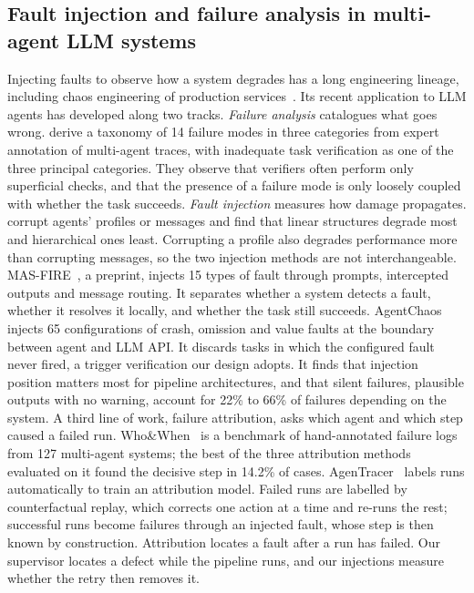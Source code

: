 \subsection{Fault injection and failure analysis in multi-agent LLM systems}
\label{sec:related-fi}

Injecting faults to observe how a system degrades has a long engineering
lineage, including chaos engineering of production services~\citep{basiri2016chaos}.
Its recent application to LLM agents has developed along two tracks.
\emph{Failure analysis} catalogues what goes wrong. \citet{cemri2025mast}
derive a taxonomy of 14 failure modes in three categories from expert annotation
of multi-agent traces, with inadequate task verification as one of the three
principal categories. They observe that verifiers often perform only
superficial checks, and that the presence of a failure mode is only loosely
coupled with whether the task succeeds. \emph{Fault injection} measures how
damage propagates. \citet{huang2025resilience} corrupt agents' profiles or
messages and find that linear structures degrade most and hierarchical ones
least. Corrupting a profile also degrades performance more than corrupting
messages, so the two injection methods are not interchangeable.
MAS-FIRE~\citep{jia2026masfire}, a preprint, injects 15 types of fault through
prompts, intercepted outputs and message routing. It separates whether a system
detects a fault, whether it resolves it locally, and whether the task still
succeeds. AgentChaos~\citep{tan2026agentchaos} injects 65 configurations of
crash, omission and value faults at the boundary between agent and LLM API.
It discards tasks in which the configured fault never fired, a trigger
verification our design adopts. It finds that injection position matters most
for pipeline architectures, and that silent failures, plausible outputs with no
warning, account for 22\% to 66\% of failures depending on the system.
A third line of work, failure attribution, asks which agent and which step
caused a failed run. Who\&When~\citep{zhang2025whowhen} is a benchmark of
hand-annotated failure logs from 127 multi-agent systems; the best of the three
attribution methods evaluated on it found the decisive step in 14.2\% of cases.
AgenTracer~\citep{zhang2026agentracer} labels runs automatically to train an
attribution model. Failed runs are labelled by counterfactual replay, which
corrects one action at a time and re-runs the rest; successful runs become
failures through an injected fault, whose step is then known by construction.
Attribution locates a fault after a run has failed. Our supervisor locates a
defect while the pipeline runs, and our injections measure whether the retry
then removes it.

